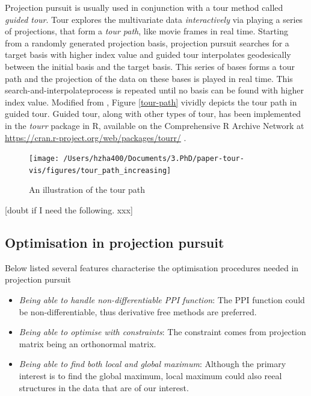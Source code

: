 \documentclass[12pt]{article}
\begin{document}
Projection pursuit is usually used in conjunction with a tour method
called \emph{guided tour}. Tour explores the multivariate data
\emph{interactively} via playing a series of projections, that form a
\emph{tour path}, like movie frames in real time. Starting from a
randomly generated projection basis, projection pursuit searches for a
target basis with higher index value and guided tour interpolates
geodesically between the initial basis and the target basis. This series
of bases forms a tour path and the projection of the data on these bases
is played in real time. This search-and-interpolateprocess is repeated
until no basis can be found with higher index value. Modified from
\citet{buja2005computational}, Figure \ref{tour-path} vividly depicts
the tour path in guided tour. Guided tour, along with other types of
tour, has been implemented in the \emph{tourr} package in R, available
on the Comprehensive R Archive Network at
\url{https://cran.r-project.org/web/packages/tourr/}
\citep{wickham2011tourrpackage}.

\begin{figure}
\texttt{[image: /Users/hzha400/Documents/3.PhD/paper-tour-vis/figures/tour\_path\_increasing]} \caption{\label{tour-path}An illustration of the tour path}\label{fig:tour-path}
\end{figure}

{[}doubt if I need the following. xxx{]}

\hypertarget{optimisation-in-projection-pursuit}{%
\subsection{Optimisation in projection
pursuit}\label{optimisation-in-projection-pursuit}}

Below listed several features characterise the optimisation procedures
needed in projection pursuit

\begin{itemize}
\item
  \emph{Being able to handle non-differentiable PPI function}: The PPI
  function could be non-differentiable, thus derivative free methods are
  preferred.
\item
  \emph{Being able to optimise with constraints}: The constraint comes
  from projection matrix being an orthonormal matrix.
\item
  \emph{Being able to find both local and global maximum}: Although the
  primary interest is to find the global maximum, local maximum could
  also reeal structures in the data that are of our interest.
\end{itemize}
\end{document}
